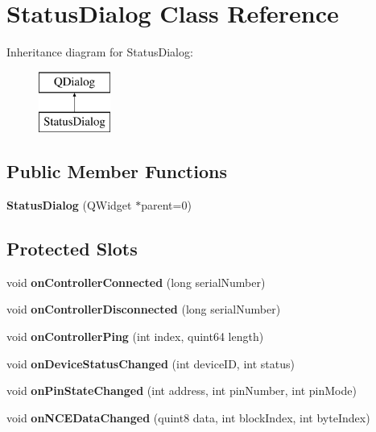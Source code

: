 \hypertarget{class_status_dialog}{}\section{Status\+Dialog Class Reference}
\label{class_status_dialog}
Inheritance diagram for Status\+Dialog\+:\begin{figure}[H]
\begin{center}
\leavevmode
\includegraphics[height=2.000000cm]{class_status_dialog}
\end{center}
\end{figure}
\subsection*{Public Member Functions}
\begin{DoxyCompactItemize}
\item 
\mbox{\label{class_status_dialog_a814831672ff09b7e3c03b61e25fe7a5d}} 
{\bfseries Status\+Dialog} (Q\+Widget $\ast$parent=0)
\end{DoxyCompactItemize}
\subsection*{Protected Slots}
\begin{DoxyCompactItemize}
\item 
\mbox{\label{class_status_dialog_a633ba41cc7be31dd2dc8dd4a405140c5}} 
void {\bfseries on\+Controller\+Connected} (long serial\+Number)
\item 
\mbox{\label{class_status_dialog_a37d4673367ef8ae402571d75ff48809b}} 
void {\bfseries on\+Controller\+Disconnected} (long serial\+Number)
\item 
\mbox{\label{class_status_dialog_a9dd8cc9ccc2786d50ac5ac2c3ff46253}} 
void {\bfseries on\+Controller\+Ping} (int index, quint64 length)
\item 
\mbox{\label{class_status_dialog_a09e16d6a6e98ad4088b261ee2692f1ae}} 
void {\bfseries on\+Device\+Status\+Changed} (int device\+ID, int status)
\item 
\mbox{\label{class_status_dialog_a97af838c425027913920559f9e4e3bfe}} 
void {\bfseries on\+Pin\+State\+Changed} (int address, int pin\+Number, int pin\+Mode)
\item 
\mbox{\label{class_status_dialog_a750b9f3c081f4e04c7981a42915168be}} 
void {\bfseries on\+N\+C\+E\+Data\+Changed} (quint8 data, int block\+Index, int byte\+Index)
\end{DoxyCompactItemize}


